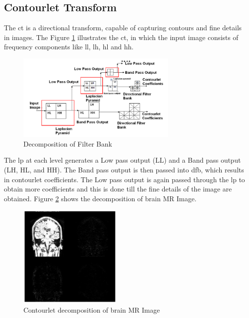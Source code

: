 \subsection{Contourlet Transform}

The \gls{ct} is a directional transform, capable of capturing contours and fine details in images. The Figure \ref{fig:contourlet_2} illustrates the \gls{ct}, in which the input image consists of frequency components like \gls{ll}, \gls{lh}, \gls{hl} and \gls{hh}. 

\begin{figure}[h]
	\centering
	\includegraphics[width=0.7\textwidth]{fig/contourlet_2}
	\caption[Contourlet Transform - Decomposition of Filter Bank]{Decomposition of Filter Bank}
	\label{fig:contourlet_2}
\end{figure}

The \gls{lp} at each level generates a Low pass output (LL) and a Band pass output (LH, HL, and HH). The Band pass output is then passed into \gls{dfb}, which
results in contourlet coefficients. The Low pass output is again passed through the \gls{lp} to obtain more coefficients and this is done till the fine details of the image are obtained. Figure \ref{fig:contourlet_mr} shows the decomposition of brain MR Image. 

\begin{figure}[h]
	\centering
	\includegraphics[width=0.45\textwidth]{fig/contourlet_mr}
	\caption[Contourlet Transform - Decomposition of brain MR Image]{Contourlet decomposition of brain MR Image}
	\label{fig:contourlet_mr}
\end{figure}



